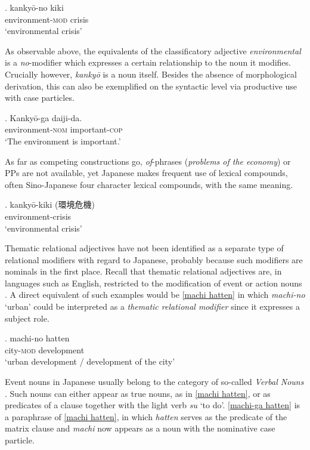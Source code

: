 \documentclass [output=book,colorlinks,citecolor=brown]{langscibook}
\begin{document}
\exg. kankyō-no kiki \\
environment-\textsc{mod} crisis\\
`environmental crisis’

As observable above, the equivalents of the classificatory adjective \textit{environmental} is a \textit{no}-modifier which expresses a certain relationship to the noun it modifies. Crucially however, \textit{kankyō} is a noun itself. Besides the absence of morphological derivation, this can also be exemplified on the syntactic level via productive use with case particles. %

\exg. Kankyō-ga daiji-da.\\
environment-\textsc{nom} important-\textsc{cop}\\
`The environment is important.’

As far as competing constructions go, \textit{of}-phrases (\textit{problems of the economy}) or PPs are not available, yet Japanese makes frequent use of lexical compounds, often Sino-Japanese four character lexical compounds, with the same meaning.

\exg. kankyō-kiki (環境危機)\\
environment-crisis\\
`environmental crisis’

Thematic relational adjectives have not been identified as a separate type of relational modifiers with regard to Japanese, probably because such modifiers are nominals in the first place. Recall that thematic relational adjectives are, in languages such as English, restricted to the modification of event or action nouns \citep{grimshaw:1991:argument}. A direct equivalent of such examples would be \ref{machi hatten} in which \textit{machi-no} `urban’ could be interpreted as a \textit{thematic relational modifier} since it expresses a subject role. %

\exg. machi-no hatten\\
city-\textsc{mod} development\\
`urban development / development of the city’ \label{machi hatten}

Event nouns in Japanese usually belong to the category of so-called \textit{Verbal Nouns} \citep{teramura:1982:nihongo, oshima:2019:gradability}. Such nouns can either appear as true nouns, as in \ref{machi hatten}, or as predicates of a clause together with the light verb \textit{su} `to do’. \ref{machi-ga hatten} is a paraphrase of \ref{machi hatten}, in which \textit{hatten} serves as the predicate of the matrix clause and \textit{machi} now appears as a noun with the nominative case particle. %
\end{document}
